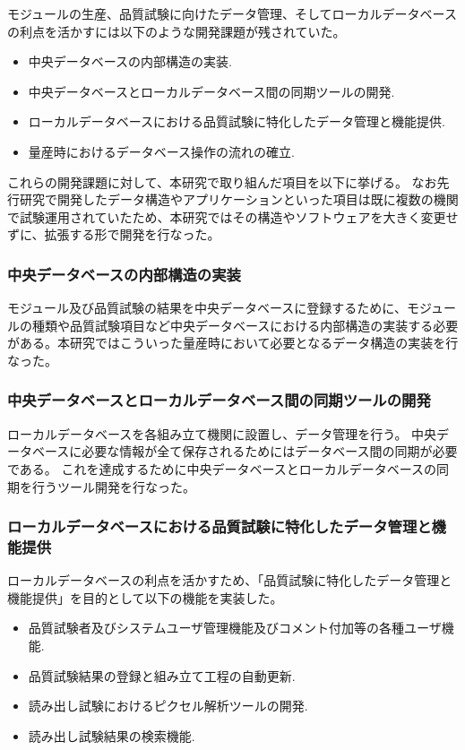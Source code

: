 モジュールの生産、品質試験に向けたデータ管理、そしてローカルデータベースの利点を活かすには以下のような開発課題が残されていた。
\begin{itemize}
  \item 中央データベースの内部構造の実装.
  \item 中央データベースとローカルデータベース間の同期ツールの開発.
  \item ローカルデータベースにおける品質試験に特化したデータ管理と機能提供.
  \item 量産時におけるデータベース操作の流れの確立.
\end{itemize}

これらの開発課題に対して、本研究で取り組んだ項目を以下に挙げる。
なお先行研究で開発したデータ構造やアプリケーションといった項目は既に複数の機関で試験運用されていたため、本研究ではその構造やソフトウェアを大きく変更せずに、拡張する形で開発を行なった。

\subsubsection{中央データベースの内部構造の実装}
モジュール及び品質試験の結果を中央データベースに登録するために、モジュールの種類や品質試験項目など中央データベースにおける内部構造の実装する必要がある。本研究ではこういった量産時において必要となるデータ構造の実装を行なった。

\subsubsection{中央データベースとローカルデータベース間の同期ツールの開発}
ローカルデータベースを各組み立て機関に設置し、データ管理を行う。
中央データベースに必要な情報が全て保存されるためにはデータベース間の同期が必要である。
これを達成するために中央データベースとローカルデータベースの同期を行うツール開発を行なった。

\subsubsection{ローカルデータベースにおける品質試験に特化したデータ管理と機能提供}
ローカルデータベースの利点を活かすため、「品質試験に特化したデータ管理と機能提供」を目的として以下の機能を実装した。
\begin{itemize}
  \item 品質試験者及びシステムユーザ管理機能及びコメント付加等の各種ユーザ機能.
  \item 品質試験結果の登録と組み立て工程の自動更新.
  \item 読み出し試験におけるピクセル解析ツールの開発.
  \item 読み出し試験結果の検索機能.
\end{itemize}

